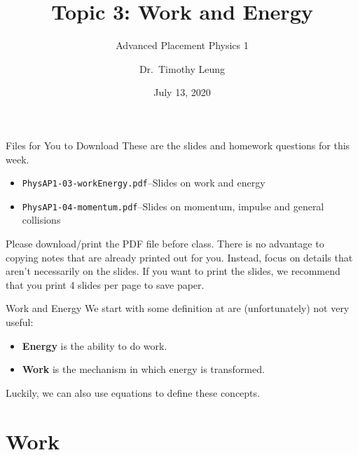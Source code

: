 \documentclass[12pt,compress,aspectratio=169]{beamer}
\title{Topic 3: Work and Energy}
\subtitle{Advanced Placement Physics 1}
\author[TML]{Dr.\ Timothy Leung}
\institute{Olympiads School}
\date{July 13, 2020}
\begin{document}
\begin{frame}
  \maketitle
\end{frame}

\begin{frame}{Files for You to Download}
  These are the slides and homework questions for this week.
  \begin{itemize}
  \item\texttt{PhysAP1-03-workEnergy.pdf}--Slides on work and energy
  \item\texttt{PhysAP1-04-momentum.pdf}--Slides on momentum, impulse and
    general collisions
  \end{itemize}
  Please download/print the PDF file before class. There is no advantage to
  copying notes that are already printed out for you. Instead, focus on details
  that aren't necessarily on the slides. If you want to print the slides, we
  recommend that you print 4 slides per page to save paper.
\end{frame}



\begin{frame}{Work and Energy}
  We start with some definition at are (unfortunately) not very useful:
  \begin{itemize}
    \item \textbf{Energy} is the ability to do work.
    \item \textbf{Work} is the mechanism in which energy is transformed.
  \end{itemize}
  Luckily, we can also use equations to define these concepts.
\end{frame}


\section{Work}
\end{document}
